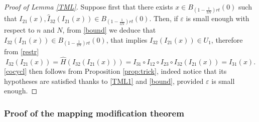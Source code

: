 \documentclass[11pt]{article}
\newcommand{\eps}{\varepsilon}
\theoremstyle{plain}
\theoremstyle{definition}
\numberwithin{equation}{section}
\begin{document}
\begin{proof}[Proof of Lemma \ref{TML}]
 Suppose first that there exists $x \in B_{(1-\frac{1}{3N})rt}(0)$ such that $I_{21}(x),\hat I_{32}(I_{21}(x))\in B_{(1-\frac{1}{3N})rt}(0).$ Then, if $\eps$ is small enough with respect to $n$ and $N$, from \eqref{bound} we deduce that $I_{32}(I_{21}(x)) \in B_{(1-\frac{1}{2N})rt}(0)$, that implies $I_{32}(I_{21}(x)) \in U_1$, therefore from \eqref{restr}
	\[ \hat I_{32}(I_{21}(x))=\hat H(I_{32}(I_{21}(x)))=I_{31}\circ  I_{12} \circ  I_{23} \circ I_{32}(I_{21}(x))=I_{31}(x). \]
	\eqref{cocycl} then follows from Proposition \ref{prop:trick}, indeed notice that its hypotheses are satisfied thanks to \eqref{TML1} and \eqref{bound}, provided $\eps$ is small enough.
\end{proof}	







\subsubsection{Proof of the mapping modification theorem}
\end{document}
